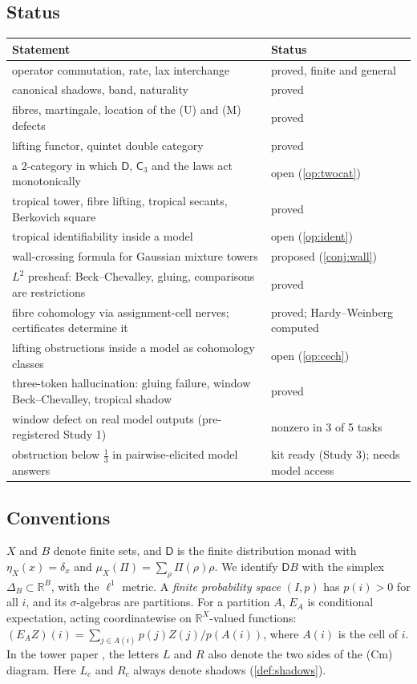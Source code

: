 \documentclass[11pt]{article}
\theoremstyle{definition}
\newcommand{\D}{\mathsf D}
\newcommand{\C}{\mathsf C}
\newcommand{\R}{\mathbb R}
\begin{document}
\subsection{Status}
\begin{center}\small
\begin{tabular}{>{\raggedright}p{9cm}>{\raggedright\arraybackslash}p{5.2cm}}\toprule
Statement & Status\\\midrule
operator commutation, rate, lax interchange & proved, finite and general\\
canonical shadows, band, naturality & proved\\
fibres, martingale, location of the (U) and (M) defects & proved\\
lifting functor, quintet double category & proved\\
a 2-category in which $\D$, $\C_3$ and the laws act monotonically & open (\cref{op:twocat})\\
tropical tower, fibre lifting, tropical secants, Berkovich square & proved\\
tropical identifiability inside a model & open (\cref{op:ident})\\
wall-crossing formula for Gaussian mixture towers & proposed (\cref{conj:wall})\\
$L^2$ presheaf: Beck--Chevalley, gluing, comparisons are restrictions & proved\\
fibre cohomology via assignment-cell nerves; certificates determine it & proved; Hardy--Weinberg computed\\
lifting obstructions inside a model as cohomology classes & open (\cref{op:cech})\\
three-token hallucination: gluing failure, window Beck--Chevalley, tropical shadow & proved\\
window defect on real model outputs (pre-registered Study 1) & nonzero in 3 of 5 tasks\\
obstruction below $\tfrac13$ in pairwise-elicited model answers & kit ready (Study 3); needs model access\\
\bottomrule
\end{tabular}
\end{center}

\subsection{Conventions}
$X$ and $B$ denote finite sets, and $\D$ is the finite distribution monad with $\eta_X(x)=\delta_x$ and $\mu_X(\Pi)=\sum_\rho\Pi(\rho)\rho$.
We identify $\D B$ with the simplex $\Delta_B\subset\R^B$, with the $\ell^1$ metric. A \emph{finite probability space} $(I,p)$ has
$p(i)>0$ for all $i$, and its $\sigma$-algebras are partitions. For a partition $A$, $E_A$ is conditional expectation, acting
coordinatewise on $\R^X$-valued functions: $(E_AZ)(i)=\sum_{j\in A(i)}p(j)Z(j)/p(A(i))$, where $A(i)$ is the cell of $i$. In the
tower paper \cite{Tower}, the letters $L$ and $R$ also denote the two sides of the (Cm) diagram. Here $L_c$ and $R_c$ always denote
shadows (\cref{def:shadows}).
\end{document}
